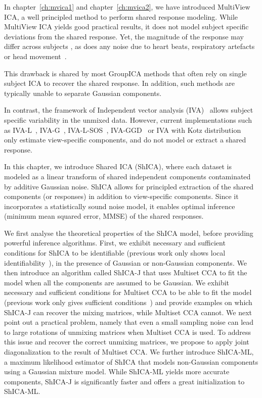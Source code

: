 In chapter~\ref{ch:mvica1} and chapter~\ref{ch:mvica2}, we have introduced MultiView ICA, a well principled method to perform shared response modeling. 
While MultiView ICA yields good practical results, it does not model subject specific deviations from the shared
response. Yet, the magnitude of the response may differ across subjects \cite{penny2007random}, as does any noise due to heart beats, respiratory artefacts or head movement~\cite{liu2016noise}.
%

This drawback is shared by most GroupICA methods that often rely on single
subject ICA to recover the shared response. In addition, such methods are typically unable to separate Gaussian components.

In contrast, the framework of Independent vector analysis
(IVA)~\cite{lee2008independent, anderson2011joint} allows subject specific
variability in the unmixed data. 
However, current implementations such as IVA-L~\cite{lee2008independent},
IVA-G~\cite{anderson2011joint}, IVA-L-SOS~\cite{bhinge2019extraction}, IVA-GGD~\cite{anderson2014independent} or
IVA with Kotz distribution~\cite{anderson2013independent} only estimate
view-specific components, and do not model or extract a shared response.


In this chapter, we introduce Shared ICA (ShICA), where each dataset is modeled as a linear transform of shared independent components contaminated by additive Gaussian noise. ShICA allows for principled extraction of the shared components (or responses) in addition to view-specific components. 
%
Since it incorporates a statistically sound noise model, it enables optimal inference (minimum mean squared error, MMSE) of the shared responses.

We first analyse the theoretical properties of the ShICA model, before providing powerful inference algorithms.
First, we exhibit necessary and sufficient conditions for ShICA to be identifiable (previous work only shows local identifiability~\cite{anderson2014independent}), in the presence of Gaussian or non-Gaussian components. 
%
We then introduce an algorithm called ShICA-J that uses Multiset CCA to fit the model when all the components are assumed to be Gaussian. We exhibit necessary and sufficient conditions for Multiset CCA to be able to fit the model (previous work only gives sufficient conditions~\cite{li2009joint}) and provide examples on which ShICA-J can recover the mixing matrices, while Multiset CCA cannot. 
%
We next point out a practical problem, namely that even a small sampling noise can lead to large rotations of unmixing matrices when Multiset CCA is used. To address this issue and recover the correct unmixing matrices, we propose to apply joint diagonalization to the result of Multiset CCA.
%
We further introduce ShICA-ML, a maximum likelihood estimator of ShICA that models non-Gaussian components using a Gaussian mixture model. 
%
While ShICA-ML yields more accurate components, ShICA-J is significantly faster and offers a great initialization to ShICA-ML.

